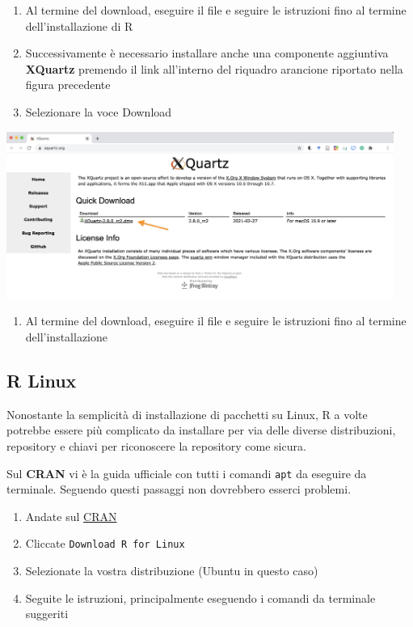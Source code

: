 \documentclass[
]{book}
\providecommand{\tightlist}{%
  \setlength{\itemsep}{0pt}\setlength{\parskip}{0pt}}
\begin{document}
\begin{enumerate}
\def\labelenumi{\arabic{enumi}.}
\setcounter{enumi}{1}
\tightlist
\item
  Al termine del download, eseguire il file e seguire le istruzioni fino al termine dell'installazione di R
\item
  Successivamente è necessario installare anche una componente aggiuntiva \textbf{XQuartz} premendo il link all'interno del riquadro arancione riportato nella figura precedente
\item
  Selezionare la voce Download
\end{enumerate}

\includegraphics[width=0.95\textwidth,height=\textheight]{images/install_Mac_XQuartz.png}

\begin{enumerate}
\def\labelenumi{\arabic{enumi}.}
\setcounter{enumi}{4}
\tightlist
\item
  Al termine del download, eseguire il file e seguire le istruzioni fino al termine dell'installazione
\end{enumerate}

\hypertarget{r-linux}{%
\subsection{R Linux}\label{r-linux}}

Nonostante la semplicità di installazione di pacchetti su Linux, R a volte potrebbe essere più complicato da installare per via delle diverse distribuzioni, repository e chiavi per riconoscere la repository come sicura.

Sul \textbf{CRAN} vi è la guida ufficiale con tutti i comandi \texttt{apt} da eseguire da terminale. Seguendo questi passaggi non dovrebbero esserci problemi.

\begin{enumerate}
\def\labelenumi{\arabic{enumi}.}
\tightlist
\item
  Andate sul \href{https://cran.r-project.org/}{CRAN}
\item
  Cliccate \texttt{Download\ R\ for\ Linux}
\item
  Selezionate la vostra distribuzione (Ubuntu in questo caso)
\item
  Seguite le istruzioni, principalmente eseguendo i comandi da terminale suggeriti
\end{enumerate}
\end{document}
